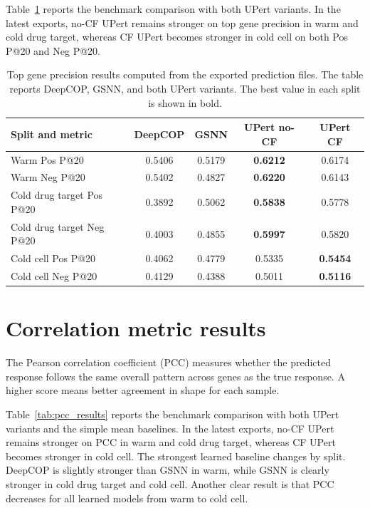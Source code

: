 \noindent Table~\ref{tab:top_gene_analysis} reports the benchmark comparison with both UPert variants. In the latest exports, no-CF UPert remains stronger on top gene precision in warm and cold drug target, whereas CF UPert becomes stronger in cold cell on both Pos P@20 and Neg P@20.

\begin{table}[!htbp]
\centering
\caption[Top Gene Precision Results]{Top gene precision results computed from the exported prediction files. The table reports DeepCOP, GSNN, and both UPert variants. The best value in each split is shown in bold.}
\label{tab:top_gene_analysis}
\begin{tabular}{lcccc}
\hline
Split and metric & DeepCOP & GSNN & UPert no-CF & UPert CF \\
\hline
Warm Pos P@20 & 0.5406 & 0.5179 & \textbf{0.6212} & 0.6174 \\
Warm Neg P@20 & 0.5402 & 0.4827 & \textbf{0.6220} & 0.6143 \\
Cold drug target Pos P@20 & 0.3892 & 0.5062 & \textbf{0.5838} & 0.5778 \\
Cold drug target Neg P@20 & 0.4003 & 0.4855 & \textbf{0.5997} & 0.5820 \\
Cold cell Pos P@20 & 0.4062 & 0.4779 & 0.5335 & \textbf{0.5454} \\
Cold cell Neg P@20 & 0.4129 & 0.4388 & 0.5011 & \textbf{0.5116} \\
\hline
\end{tabular}
\end{table}

\section{Correlation metric results}
The Pearson correlation coefficient (PCC) measures whether the predicted response follows the same overall pattern across genes as the true response. A higher score means better agreement in shape for each sample.

\noindent Table~\ref{tab:pcc_results} reports the benchmark comparison with both UPert variants and the simple mean baselines. In the latest exports, no-CF UPert remains stronger on PCC in warm and cold drug target, whereas CF UPert becomes stronger in cold cell. The strongest learned baseline changes by split. DeepCOP is slightly stronger than GSNN in warm, while GSNN is clearly stronger in cold drug target and cold cell. Another clear result is that PCC decreases for all learned models from warm to cold cell.

